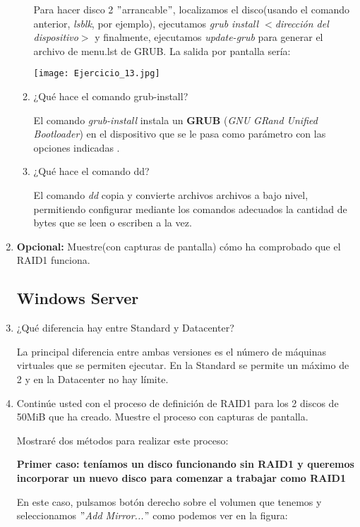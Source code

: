 \documentclass[paper=a4, fontsize=11pt]{scrartcl} %
\numberwithin{equation}{section} %
\numberwithin{figure}{section} %
\numberwithin{table}{section} %
\begin{document}
\begin{enumerate}
\begin{enumerate}
			Para hacer disco 2 $"$arrancable$"$, localizamos el disco(usando el comando anterior,
			\textit{lsblk}, por ejemplo), ejecutamos \textit{grub install $<$dirección del dispositivo$>$}
			y finalmente, ejecutamos \textit{update-grub} para generar el archivo de menu.lst de GRUB.
			La salida por pantalla sería:
			
			\texttt{[image: Ejercicio\_13.jpg]}
			
			\item ¿Qué hace el comando grub-install?
			
			El comando \textit{grub-install} instala un \textbf{GRUB} (\textit{GNU GRand Unified
			Bootloader}) en el dispositivo que se le pasa como parámetro con las opciones indicadas
			\cite{man_grub-install}.
			
			\item ¿Qué hace el comando dd?
			
			El comando \textit{dd} copia y convierte archivos archivos a bajo nivel, permitiendo configurar
			mediante los comandos adecuados la cantidad de bytes que se leen o escriben a la vez\cite{man_dd}.
			
		\end{enumerate}
		
		\item \textbf{Opcional:} Muestre(con capturas de pantalla) cómo ha comprobado que el RAID1
		funciona.
		
		
		
	\subsection{Windows Server}
		\item ¿Qué diferencia hay entre Standard y Datacenter?
		
		La principal diferencia entre ambas versiones es el número de máquinas virtuales que se
		permiten ejecutar. En la Standard se permite un máximo de 2 y en la Datacenter no hay
		límite.\cite{W12_v}
		
		\item Continúe usted con el proceso de definición de RAID1 para los 2 discos de 50MiB que
		ha creado. Muestre el proceso con capturas de pantalla.
		
		Mostraré dos métodos para realizar este proceso: 
		
		\textbf{Primer caso: teníamos un disco funcionando sin RAID1 y queremos incorporar un nuevo
		disco para comenzar a trabajar como RAID1}
		
		En este caso, pulsamos botón derecho sobre el volumen que tenemos y seleccionamos
		\textit{$"$Add Mirror...$"$} como podemos ver en la figura:
		

\end{enumerate}
\end{document}
